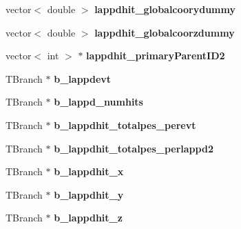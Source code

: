 \begin{DoxyCompactItemize}
\item 
\hypertarget{classLAPPDTree_a43f80af2bdabd39c31346a526b8e9a5c}{
vector$<$ double $>$ {\bfseries lappdhit\_\-globalcoorydummy}}
\label{classLAPPDTree_a43f80af2bdabd39c31346a526b8e9a5c}

\item 
\hypertarget{classLAPPDTree_a9ed8c2c3aa42ecc9fbaa575caa076940}{
vector$<$ double $>$ {\bfseries lappdhit\_\-globalcoorzdummy}}
\label{classLAPPDTree_a9ed8c2c3aa42ecc9fbaa575caa076940}

\item 
\hypertarget{classLAPPDTree_a372097f371b2bbd414b6447da2e5fd51}{
vector$<$ int $>$ $\ast$ {\bfseries lappdhit\_\-primaryParentID2}}
\label{classLAPPDTree_a372097f371b2bbd414b6447da2e5fd51}

\item 
\hypertarget{classLAPPDTree_af47a619c8a87743efecb91b7fbf2c7be}{
TBranch $\ast$ {\bfseries b\_\-lappdevt}}
\label{classLAPPDTree_af47a619c8a87743efecb91b7fbf2c7be}

\item 
\hypertarget{classLAPPDTree_af2d3bcf8ac6d1984ddd5da708841fd81}{
TBranch $\ast$ {\bfseries b\_\-lappd\_\-numhits}}
\label{classLAPPDTree_af2d3bcf8ac6d1984ddd5da708841fd81}

\item 
\hypertarget{classLAPPDTree_aaffff4e3fa3c778499625bc2c79179de}{
TBranch $\ast$ {\bfseries b\_\-lappdhit\_\-totalpes\_\-perevt}}
\label{classLAPPDTree_aaffff4e3fa3c778499625bc2c79179de}

\item 
\hypertarget{classLAPPDTree_a97ffd58d9a74db4d2026aea619e55c3e}{
TBranch $\ast$ {\bfseries b\_\-lappdhit\_\-totalpes\_\-perlappd2}}
\label{classLAPPDTree_a97ffd58d9a74db4d2026aea619e55c3e}

\item 
\hypertarget{classLAPPDTree_aaa3ff0b6eefee590df4209064eb2907f}{
TBranch $\ast$ {\bfseries b\_\-lappdhit\_\-x}}
\label{classLAPPDTree_aaa3ff0b6eefee590df4209064eb2907f}

\item 
\hypertarget{classLAPPDTree_adc45ffd7b8f116526d1683182a8b0104}{
TBranch $\ast$ {\bfseries b\_\-lappdhit\_\-y}}
\label{classLAPPDTree_adc45ffd7b8f116526d1683182a8b0104}

\item 
\hypertarget{classLAPPDTree_ac15eb6f5a771b3a8a4af9f98ef64642c}{
TBranch $\ast$ {\bfseries b\_\-lappdhit\_\-z}}
\label{classLAPPDTree_ac15eb6f5a771b3a8a4af9f98ef64642c}


\end{DoxyCompactItemize}
